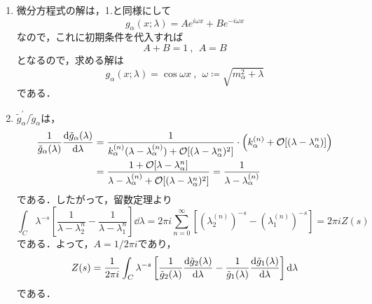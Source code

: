 \documentclass[a4paper,pdflatex,ja=standard]{bxjsarticle}
\begin{document}
\begin{enumerate}
\begin{enumerate}
    \item
    微分方程式の解は，1.と同様にして
    \begin{equation}
      g_{\alpha}(x;\lambda)
      =
      Ae^{i\omega x}
      +
      Be^{-i\omega x}
    \end{equation}
    なので，これに初期条件を代入すれば
    \begin{equation}
      A+B=1
      \ ,\ \ 
      A=B
    \end{equation}
    となるので，求める解は
    \begin{equation}
      g_{\alpha}(x;\lambda)
      =
      \cos\omega x
      \ ,\ \ 
      \omega
      \coloneqq
      \sqrt{m_{\alpha}^2+\lambda}
    \end{equation}
    である．

    \item 
    $\tilde{g}_{\alpha}^{\prime}/\tilde{g}_{\alpha}$は，
    \begin{align}
      \frac{1}{\tilde{g}_{\alpha}(\lambda)}\dv{\tilde{g}_{\alpha}(\lambda)}{\lambda}
      &=
      \frac{1}{k_{\alpha}^{(n)}(\lambda-\lambda_{\alpha}^{(n)})+\mathcal{O}[(\lambda-\lambda_{\alpha}^{n})^2]}
      \cdot
      \left( k_{\alpha}^{(n)}+\mathcal{O}[(\lambda-\lambda_{\alpha}^{n})] \right)
      \nonumber
      \\
      &=
      \frac{1+\mathcal{O}[\lambda-\lambda_{\alpha}^{n}]}{\lambda-\lambda_{\alpha}^{(n)}+\mathcal{O}[(\lambda-\lambda_{\alpha}^{n})^2]}
      =
      \frac{1}{\lambda-\lambda_{\alpha}^{(n)}}
    \end{align}
    である．したがって，留数定理より
    \begin{equation}
      \int_{C}\lambda^{-s}\left[  
        \frac{1}{\lambda-\lambda_{2}^{n}}
        -
        \frac{1}{\lambda-\lambda_{1}^{n}}
      \right]
      \dd \lambda
      =
      2\pi i\sum_{n=0}^{\infty}\left[ \left( \lambda_{2}^{(n)} \right)^{-s} - \left( \lambda_{1}^{(n)} \right)^{-s} \right]
      =
      2\pi i Z(s)
    \end{equation}
    である．よって，$A=1/2\pi i$であり，
    \begin{equation}
      Z(s)
      =
      \frac{1}{2\pi i}
      \int_{C}\lambda^{-s}
      \left[  
        \frac{1}{\tilde{g}_{2}(\lambda)}\dv{\tilde{g}_{2}(\lambda)}{\lambda}
        -
        \frac{1}{\tilde{g}_{1}(\lambda)}\dv{\tilde{g}_{1}(\lambda)}{\lambda}
      \right]
      \dd \lambda
      \label{sol4}
    \end{equation}
    である．


\end{enumerate}
\end{enumerate}
\end{document}
